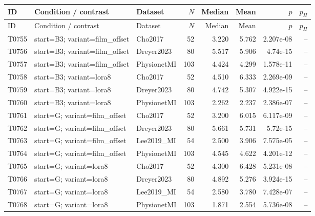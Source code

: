 \begin{longtable}{p{.45in}p{2.6in}p{.75in}rrrrr}
\toprule
ID & Condition / contrast & Dataset & $N$ & Median & Mean & $p$ & $p_H$ \\
\midrule
\endfirsthead
\toprule
ID & Condition / contrast & Dataset & $N$ & Median & Mean & $p$ & $p_H$ \\
\midrule
\endhead
T0755 & start=B3; variant=film\_\allowbreak{}offset & Cho2017 & 52 & 3.220 & 5.762 & 2.207e-08 & -- \\
T0756 & start=B3; variant=film\_\allowbreak{}offset & Dreyer2023 & 80 & 5.517 & 5.906 & 4.74e-15 & -- \\
T0757 & start=B3; variant=film\_\allowbreak{}offset & PhysionetMI & 103 & 4.424 & 4.299 & 1.578e-11 & -- \\
T0758 & start=B3; variant=lora8 & Cho2017 & 52 & 4.510 & 6.333 & 2.269e-09 & -- \\
T0759 & start=B3; variant=lora8 & Dreyer2023 & 80 & 4.742 & 5.307 & 4.922e-15 & -- \\
T0760 & start=B3; variant=lora8 & PhysionetMI & 103 & 2.262 & 2.237 & 2.386e-07 & -- \\
T0761 & start=G; variant=film\_\allowbreak{}offset & Cho2017 & 52 & 3.200 & 6.015 & 6.117e-09 & -- \\
T0762 & start=G; variant=film\_\allowbreak{}offset & Dreyer2023 & 80 & 5.661 & 5.731 & 5.72e-15 & -- \\
T0763 & start=G; variant=film\_\allowbreak{}offset & Lee2019\_\allowbreak{}MI & 54 & 2.500 & 3.906 & 7.575e-05 & -- \\
T0764 & start=G; variant=film\_\allowbreak{}offset & PhysionetMI & 103 & 4.545 & 4.622 & 4.201e-12 & -- \\
T0765 & start=G; variant=lora8 & Cho2017 & 52 & 4.300 & 6.428 & 5.231e-08 & -- \\
T0766 & start=G; variant=lora8 & Dreyer2023 & 80 & 4.892 & 5.276 & 3.924e-15 & -- \\
T0767 & start=G; variant=lora8 & Lee2019\_\allowbreak{}MI & 54 & 2.580 & 3.780 & 7.428e-07 & -- \\
T0768 & start=G; variant=lora8 & PhysionetMI & 103 & 1.871 & 2.554 & 5.736e-08 & -- \\
\bottomrule
\end{longtable}

